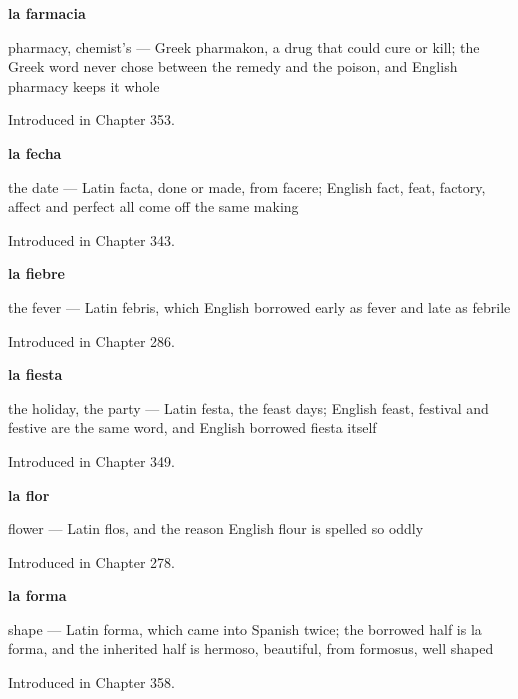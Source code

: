 \noindent\begin{minipage}[t]{\linewidth}
\raggedright
\textbf{la farmacia}\par
\small pharmacy, chemist's — Greek pharmakon, a drug that could cure or kill; the Greek word never chose between the remedy and the poison, and English pharmacy keeps it whole\par
\footnotesize Introduced in Chapter 353.
\end{minipage}\par\medskip

\noindent\begin{minipage}[t]{\linewidth}
\raggedright
\textbf{la fecha}\par
\small the date — Latin facta, done or made, from facere; English fact, feat, factory, affect and perfect all come off the same making\par
\footnotesize Introduced in Chapter 343.
\end{minipage}\par\medskip

\noindent\begin{minipage}[t]{\linewidth}
\raggedright
\textbf{la fiebre}\par
\small the fever — Latin febris, which English borrowed early as fever and late as febrile\par
\footnotesize Introduced in Chapter 286.
\end{minipage}\par\medskip

\noindent\begin{minipage}[t]{\linewidth}
\raggedright
\textbf{la fiesta}\par
\small the holiday, the party — Latin festa, the feast days; English feast, festival and festive are the same word, and English borrowed fiesta itself\par
\footnotesize Introduced in Chapter 349.
\end{minipage}\par\medskip

\noindent\begin{minipage}[t]{\linewidth}
\raggedright
\textbf{la flor}\par
\small flower — Latin flos, and the reason English flour is spelled so oddly\par
\footnotesize Introduced in Chapter 278.
\end{minipage}\par\medskip

\noindent\begin{minipage}[t]{\linewidth}
\raggedright
\textbf{la forma}\par
\small shape — Latin forma, which came into Spanish twice; the borrowed half is la forma, and the inherited half is hermoso, beautiful, from formosus, well shaped\par
\footnotesize Introduced in Chapter 358.
\end{minipage}\par\medskip

